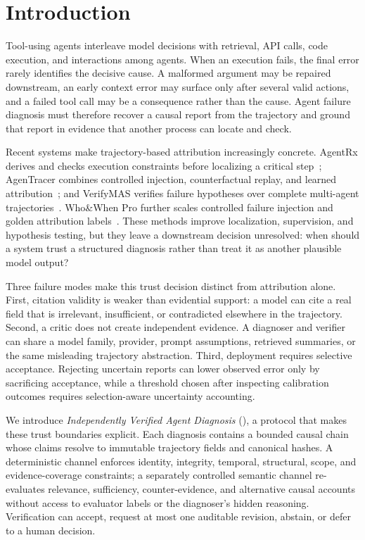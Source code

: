 \section{Introduction}
\label{sec:introduction}

Tool-using agents interleave model decisions with retrieval, API calls, code
execution, and interactions among agents. When an execution fails, the final
error rarely identifies the decisive cause. A malformed argument may be
repaired downstream, an early context error may surface only after several
valid actions, and a failed tool call may be a consequence rather than the
cause. Agent failure diagnosis must therefore recover a causal report from the
trajectory and ground that report in evidence that another process can locate
and check.

Recent systems make trajectory-based attribution increasingly concrete.
AgentRx derives and checks execution constraints before localizing a critical
step~\cite{barke2026agentrx}; AgenTracer combines controlled injection,
counterfactual replay, and learned attribution~\cite{zhang2025agentracer}; and
VerifyMAS verifies failure hypotheses over complete multi-agent
trajectories~\cite{qiao2026verifymas}. Who\&When Pro further scales controlled
failure injection and golden attribution labels~\cite{liu2026whowhenpro}.
These methods improve localization, supervision, and hypothesis testing, but
they leave a downstream decision unresolved: when should a system trust a
structured diagnosis rather than treat it as another plausible model output?

Three failure modes make this trust decision distinct from attribution alone.
First, citation validity is weaker than evidential support: a model can cite a
real field that is irrelevant, insufficient, or contradicted elsewhere in the
trajectory. Second, a critic does not create independent evidence. A diagnoser
and verifier can share a model family, provider, prompt assumptions, retrieved
summaries, or the same misleading trajectory abstraction. Third, deployment
requires selective acceptance. Rejecting uncertain reports can lower observed
error only by sacrificing acceptance, while a threshold chosen after inspecting
calibration outcomes requires selection-aware uncertainty accounting.

We introduce \emph{Independently Verified Agent Diagnosis} (\method), a
protocol that makes these trust boundaries explicit. Each diagnosis contains a
bounded causal chain whose claims resolve to immutable trajectory fields and
canonical hashes. A deterministic channel enforces identity, integrity,
temporal, structural, scope, and evidence-coverage constraints; a separately
controlled semantic channel re-evaluates relevance, sufficiency,
counter-evidence, and alternative causal accounts without access to evaluator
labels or the diagnoser's hidden reasoning. Verification can accept, request at
most one auditable revision, abstain, or defer to a human decision.

